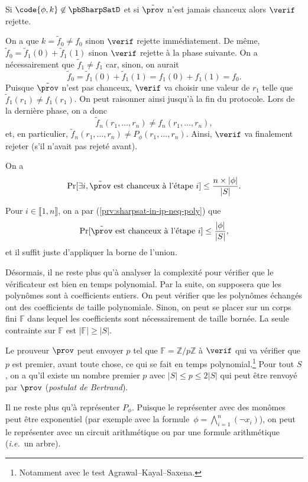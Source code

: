 \documentclass[./main]{subfiles}
\begin{document}
\begin{prv}
    \begin{lem}
      Si $\code{\phi, k} \not\in \pbSharpSatD$ et si $\tilde{\prov}$ n'est jamais chanceux alors $\verif$ rejette.
    \end{lem}
    \begin{prv}
      On a que $k = \tilde f_0 \neq f_0$ sinon $\verif$ rejette immédiatement.
      De même, $\tilde f_0 = \tilde f_1 (0) + \tilde f_1 (1)$ sinon $\verif$
      rejette à la phase suivante.
      On a nécessairement que $\tilde f_1 \neq f_1$ car, sinon, on aurait
      \[
      \tilde f_0 = \tilde f_1 (0) + \tilde f_1 (1) = f_1(0) + f_1(1) = f_0
      .\]
      Puisque $\tilde{\prov}$ n'est pas chanceux, $\verif$ va choisir une
      valeur de $r_1$ telle que $\tilde f_1 (r_1) \neq f_1(r_1)$. On peut
      raisonner ainsi jusqu'à la fin du protocole. Lors de la dernière phase, on a donc \[
      \tilde f_n(r_1, \ldots, r_n) \neq f_n(r_1, \ldots, r_n)
      ,\]
      et, en particulier, $\tilde f_n(r_1, \ldots, r_n) \neq P_\phi(r_1,
      \ldots, r_n)$. Ainsi, $\verif$ va finalement rejeter (s'il n'avait pas
      rejeté avant).
    \end{prv}

    \begin{lem}
      On a
      \[
        \Pr[\exists i, \text{$\tilde {\prov}$ est chanceux à l'étape $i$}] \le \frac{n \times |\phi|}{|S|}
      .\]
    \end{lem}
    \begin{prv}
      Pour $i \in \llbracket 1, n\rrbracket$, on a par (\ref{prv:sharpsat-in-ip-neq-poly}) que
      \[
        \Pr[\text{$\tilde {\prov}$ est chanceux à l'étape $i$}] \le \frac{|\phi|}{|S|}
      ,\]
      et il suffit juste d'appliquer la borne de l'union.
    \end{prv}

    Désormais, il ne reste plus qu'à analyser la complexité pour vérifier que
    le vérificateur est bien en temps polynomial. Par la suite, on supposera
    que les polynômes sont à coefficients entiers. On peut vérifier que les
    polynômes échangés ont des coefficients de taille polynomiale. Sinon, on
    peut se placer sur un corps fini $\mathds{F}$ dans lequel les coefficients
    sont nécessairement de taille bornée. La seule contrainte sur $\mathds{F}$
    est $|\mathds{F}| \ge |S|$.
    
    Le prouveur $\prov$ peut envoyer $p$ tel que $\mathds{F} = \mathds{Z} / p
    \mathds{Z}$ à $\verif$ qui va vérifier que $p$ est premier, avant toute
    chose, ce qui se fait en temps polynomial.\footnote{Notamment avec le test
    Agrawal–Kayal–Saxena.} Pour tout $S$, on a qu'il existe un nombre premier
    $p$ avec $|S| \le p \le 2 |S|$ qui peut être renvoyé par $\prov$
    (\textit{postulat de Bertrand}).

    Il ne reste plus qu'à représenter $P_\phi$.
    Puisque le représenter avec des monômes peut être exponentiel (par exemple
    avec la formule~$\phi = \bigwedge_{i=1}^n (\lnot x_i)$), on peut le
    représenter avec un circuit arithmétique ou par une formule arithmétique
    (\textit{i.e.}\ un arbre).
  \end{prv}
\end{document}
